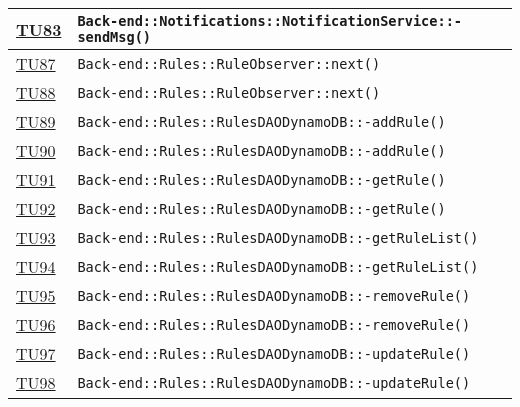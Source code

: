 \begin{longtable}{|>{\centering}m{1cm}|m{12cm}<{\centering}|}
\hyperlink{TU83}{TU83} & \texttt{Back-end::Notifications::NotificationService::-\linebreak sendMsg()}\\ \hline

\hyperlink{TU87}{TU87} & \texttt{Back-end::Rules::RuleObserver::next()}\\ \hline

\hyperlink{TU88}{TU88} & \texttt{Back-end::Rules::RuleObserver::next()}\\ \hline

\hyperlink{TU89}{TU89} & \texttt{Back-end::Rules::RulesDAODynamoDB::-\linebreak addRule()}\\ \hline

\hyperlink{TU90}{TU90} & \texttt{Back-end::Rules::RulesDAODynamoDB::-\linebreak addRule()}\\ \hline

\hyperlink{TU91}{TU91} & \texttt{Back-end::Rules::RulesDAODynamoDB::-\linebreak getRule()}\\ \hline

\hyperlink{TU92}{TU92} & \texttt{Back-end::Rules::RulesDAODynamoDB::-\linebreak getRule()}\\ \hline

\hyperlink{TU93}{TU93} & \texttt{Back-end::Rules::RulesDAODynamoDB::-\linebreak getRuleList()}\\ \hline

\hyperlink{TU94}{TU94} & \texttt{Back-end::Rules::RulesDAODynamoDB::-\linebreak getRuleList()}\\ \hline

\hyperlink{TU95}{TU95} & \texttt{Back-end::Rules::RulesDAODynamoDB::-\linebreak removeRule()}\\ \hline

\hyperlink{TU96}{TU96} & \texttt{Back-end::Rules::RulesDAODynamoDB::-\linebreak removeRule()}\\ \hline

\hyperlink{TU97}{TU97} & \texttt{Back-end::Rules::RulesDAODynamoDB::-\linebreak updateRule()}\\ \hline

\hyperlink{TU98}{TU98} & \texttt{Back-end::Rules::RulesDAODynamoDB::-\linebreak updateRule()}\\ \hline


\end{longtable}
